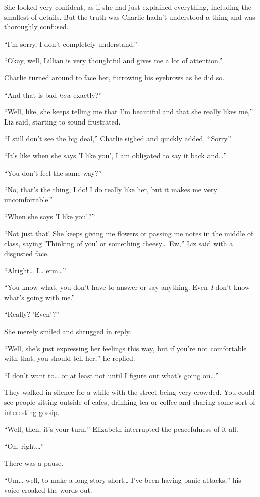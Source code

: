 She looked very confident, as if she had just explained everything, including the smallest of details. But the truth was Charlie hadn't understood a thing and was thoroughly confused.

“I'm sorry, I don't completely understand.”

“Okay, well, Lillian is very thoughtful and gives me a lot of attention.”

Charlie turned around to face her, furrowing his eyebrows as he did so.

“And that is bad \textit{how} exactly?”

“Well, like, she keeps telling me that I'm beautiful and that she really likes me,” Liz said, starting to sound frustrated.

“I still don't see the big deal,” Charlie sighed and quickly added, “Sorry.”

“It's like when she says 'I like you', I am obligated to say it back and…”

“You don't feel the same way?”

“No, that's the thing, I do! I do really like her, but it makes me very uncomfortable.”

“When she says 'I like you'?”

“Not just that! She keeps giving me flowers or passing me notes in the middle of class, saying 'Thinking of you' or something cheesy… Ew,” Liz said with a disgusted face.

“Alright… I… erm…”

“You know what, you don't have to answer or say anything. Even \textit{I} don't know what's going with me.”

“Really? 'Even'?”

She merely smiled and shrugged in reply.

“Well, she's just expressing her feelings this way, but if you're not comfortable with that, you should tell her,” he replied.

“I don't want to… or at least not until I figure out what's going on…”

They walked in silence for a while with the street being very crowded. You could see people sitting outside of cafes, drinking tea or coffee and sharing some sort of interesting gossip.

“Well, then, it's your turn,” Elizabeth interrupted the peacefulness of it all.

“Oh, right…”

There was a pause.

“Um… well, to make a long story short… I've been having panic attacks,” his voice croaked the words out.

